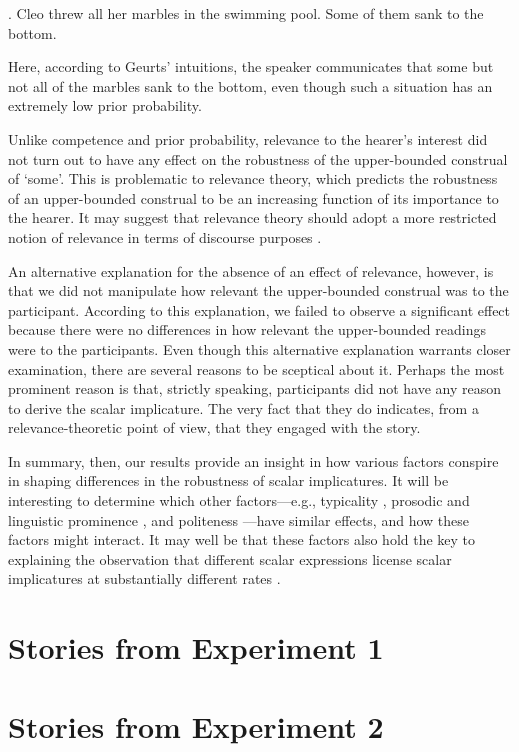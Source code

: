\documentclass[12pt]{article}
\begin{document}
\ex.	Cleo threw all her marbles in the swimming pool. Some of them sank to the bottom.

Here, according to Geurts' intuitions, the speaker communicates that some but not all of the marbles sank to the bottom, even though such a situation has an extremely low prior probability.

Unlike competence and prior probability, relevance to the hearer's interest did not turn out to have any effect on the robustness of the upper-bounded construal of `some'. This is problematic to relevance theory, which predicts the robustness of an upper-bounded construal to be an increasing function of its importance to the hearer. It may suggest that relevance theory should adopt a more restricted notion of relevance in terms of discourse purposes \citep{cummins2015}.

An alternative explanation for the absence of an effect of relevance, however, is that we did not manipulate how relevant the upper-bounded construal was to the participant. According to this explanation, we failed to observe a significant effect because there were no differences in how relevant the upper-bounded readings were to the participants. Even though this alternative explanation warrants closer examination, there are several reasons to be sceptical about it. Perhaps the most prominent reason is that, strictly speaking, participants did not have any reason to derive the scalar implicature. The very fact that they do indicates, from a relevance-theoretic point of view, that they engaged with the story.

In summary, then, our results provide an insight in how various factors conspire in shaping differences in the robustness of scalar implicatures. It will be interesting to determine which other factors---e.g., typicality \citep{tiel2013}, prosodic and linguistic prominence \citep{breheny2006}, and politeness \citep{bonnefon2009}---have similar effects, and how these factors might interact. It may well be that these factors also hold the key to explaining the observation that different scalar expressions license scalar implicatures at substantially different rates \citep{tiel2016}.

\appendix

\section{Stories from Experiment 1}
\label{sec:mater-exper-1}


\section{Stories from Experiment 2}
\label{sec:mater-exper-2}


\normalsize



\end{document}
